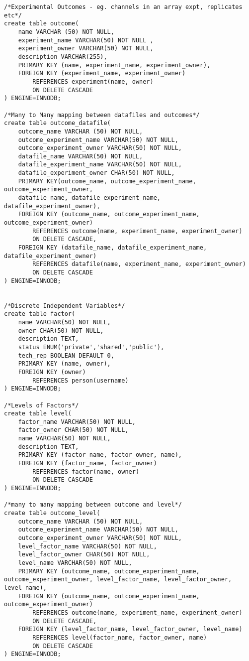 \begin{tiny}
\begin{verbatim}
/*Experimental Outcomes - eg. channels in an array expt, replicates etc*/
create table outcome(
	name VARCHAR (50) NOT NULL,
	experiment_name VARCHAR(50) NOT NULL ,
	experiment_owner VARCHAR(50) NOT NULL,
	description VARCHAR(255),
	PRIMARY KEY (name, experiment_name, experiment_owner),
	FOREIGN KEY (experiment_name, experiment_owner)
		REFERENCES experiment(name, owner)
		ON DELETE CASCADE
) ENGINE=INNODB;

/*Many to Many mapping between datafiles and outcomes*/
create table outcome_datafile(
	outcome_name VARCHAR (50) NOT NULL,
	outcome_experiment_name VARCHAR(50) NOT NULL,
	outcome_experiment_owner VARCHAR(50) NOT NULL,
	datafile_name VARCHAR(50) NOT NULL,
	datafile_experiment_name VARCHAR(50) NOT NULL,
	datafile_experiment_owner CHAR(50) NOT NULL,
	PRIMARY KEY(outcome_name, outcome_experiment_name, outcome_experiment_owner, 
	datafile_name, datafile_experiment_name, datafile_experiment_owner),
	FOREIGN KEY (outcome_name, outcome_experiment_name, outcome_experiment_owner)
		REFERENCES outcome(name, experiment_name, experiment_owner)
		ON DELETE CASCADE,
	FOREIGN KEY (datafile_name, datafile_experiment_name, datafile_experiment_owner)
		REFERENCES datafile(name, experiment_name, experiment_owner)
		ON DELETE CASCADE
) ENGINE=INNODB;


/*Discrete Independent Variables*/
create table factor(
	name VARCHAR(50) NOT NULL,
	owner CHAR(50) NOT NULL,
	description TEXT,
	status ENUM('private','shared','public'),
	tech_rep BOOLEAN DEFAULT 0,
	PRIMARY KEY (name, owner),
	FOREIGN KEY (owner)
		REFERENCES person(username)
) ENGINE=INNODB;

/*Levels of Factors*/
create table level(
	factor_name VARCHAR(50) NOT NULL,
	factor_owner CHAR(50) NOT NULL,
	name VARCHAR(50) NOT NULL,
	description TEXT,
	PRIMARY KEY (factor_name, factor_owner, name),
	FOREIGN KEY (factor_name, factor_owner)
		REFERENCES factor(name, owner)
		ON DELETE CASCADE
) ENGINE=INNODB;

/*many to many mapping between outcome and level*/
create table outcome_level(
	outcome_name VARCHAR (50) NOT NULL,
	outcome_experiment_name VARCHAR(50) NOT NULL,
	outcome_experiment_owner VARCHAR(50) NOT NULL,
	level_factor_name VARCHAR(50) NOT NULL,
	level_factor_owner CHAR(50) NOT NULL,
	level_name VARCHAR(50) NOT NULL,
	PRIMARY KEY (outcome_name, outcome_experiment_name, outcome_experiment_owner, level_factor_name, level_factor_owner, level_name),
	FOREIGN KEY (outcome_name, outcome_experiment_name, outcome_experiment_owner)
		REFERENCES outcome(name, experiment_name, experiment_owner)	
		ON DELETE CASCADE,
	FOREIGN KEY (level_factor_name, level_factor_owner, level_name)
		REFERENCES level(factor_name, factor_owner, name)
		ON DELETE CASCADE
) ENGINE=INNODB;


\end{verbatim}
\end{tiny}
